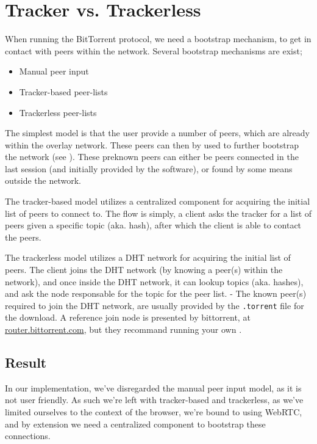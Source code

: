 \section{Tracker vs. Trackerless}

When running the BitTorrent protocol, we need a bootstrap mechanism, to get in
contact with peers within the network. Several bootstrap mechanisms are exist;
\begin{itemize}
\item Manual peer input
\item Tracker-based peer-lists
\item Trackerless peer-lists
\end{itemize}
The simplest model is that the user provide a number of peers, which are
already within the overlay network. These peers can then by used to further
bootstrap the network (see \citep{bittorrent:bep11}). These preknown peers
can either be peers connected in the last session (and initially provided by
the software), or found by some means outside the network.

The tracker-based model utilizes a centralized component for acquiring the
initial list of peers to connect to. The flow is simply, a client asks the
tracker for a list of peers given a specific topic (aka. hash), after which the
client is able to contact the peers.

The trackerless model utilizes a DHT network for acquiring the initial list of 
peers. The client joins the DHT network (by knowing a peer(s) within the network),
and once inside the DHT network, it can lookup topics (aka. hashes), and ask
the node responsable for the topic for the peer list.
\newline
- The known peer(s) required to join the DHT network, are usually provided by
the \verb|.torrent| file for the download. A reference join node is presented
by bittorrent, at \url{router.bittorrent.com}, but they recommand running your
own \citep{bittorrent:bep05}.

\subsection{Result}
In our implementation, we've disregarded the manual peer input model, as it is
not user friendly. As such we're left with tracker-based and trackerless, as 
we've limited ourselves to the context of the browser, we're bound to using 
WebRTC, and by extension we need a centralized component to bootstrap these
connections. 

